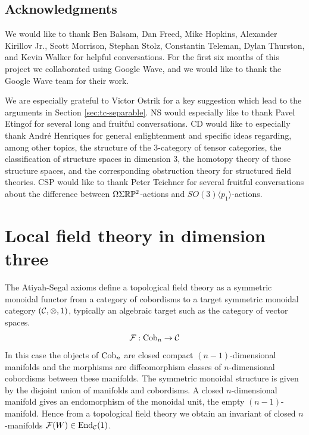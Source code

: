 \documentclass{amsart}
\begin{document}
\subsection*{Acknowledgments}

We would like to thank Ben Balsam, Dan Freed, Mike Hopkins, Alexander Kirillov Jr., Scott Morrison, Stephan Stolz, Constantin Teleman, Dylan Thurston, and Kevin Walker for helpful conversations.   For the first six months of this project we collaborated using Google Wave, and we would like to thank the Google Wave team for their work.  

We are especially grateful to Victor Ostrik for a key suggestion which lead to the arguments in Section \ref{sec:tc-separable}.  NS would especially like to thank Pavel Etingof for several long and fruitful conversations.  CD would like to especially thank Andr\'e Henriques for general enlightenment and specific ideas regarding, among other topics, the structure of the 3-category of tensor categories, the classification of structure spaces in dimension 3,  the homotopy theory of those structure spaces, and the corresponding obstruction theory for structured field theories.
CSP would like to thank Peter Teichner for several fruitful conversations about the difference between $\Omega \Sigma \mathbb R \mathbb P^2$-actions and $SO(3)\langle p_1 \rangle$-actions. 


\section{Local field theory in dimension three} \label{sec:lft}


The Atiyah-Segal axioms define a topological field theory as a symmetric monoidal functor from a category of cobordisms to a target symmetric monoidal category $(\mathcal C, \otimes, 1)$, typically an algebraic target such as the category of vector spaces. 
\begin{equation*}
	\mathcal F: \mathrm{Cob}_n \to \mathcal C
\end{equation*}
In this case the objects of $\mathrm{Cob}_n$ are closed compact $(n-1)$-dimensional manifolds and the morphisms are diffeomorphism classes of $n$-dimensional cobordisms between these manifolds. The symmetric monoidal structure is given by the disjoint union of manifolds and cobordisms. A closed $n$-dimensional manifold gives an endomorphism of the monoidal unit, the empty $(n-1)$-manifold. Hence from a topological field theory we obtain an invariant of closed $n$-manifolds $\mathcal F(W) \in \operatorname{End}_{\mathcal C}(1)$.  
\end{document}
